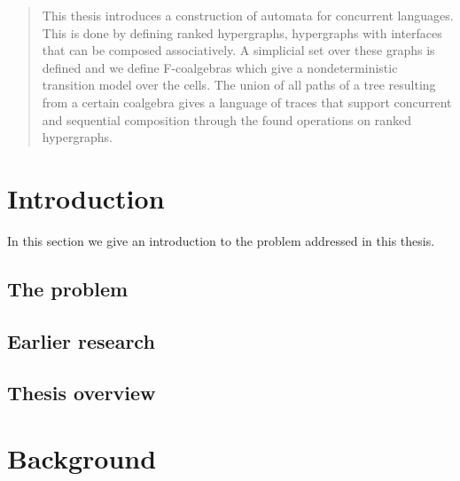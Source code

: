 \documentclass[12pt]{article}
\theoremstyle{definition}
\newcommand{\1}{\mathbbm{1}}
\begin{document}

\begin{abstract}
\noindent
This thesis introduces a construction of automata for concurrent languages. This is done by defining ranked hypergraphs, hypergraphs with interfaces that can be composed associatively. A simplicial set over these graphs is defined and we define F-coalgebras which give a nondeterministic transition model over the cells. The union of all paths of a tree resulting from a certain coalgebra gives a language of traces that support concurrent and sequential composition through the found operations on ranked hypergraphs. 
\end{abstract}

\bigskip

\thispagestyle{empty}
\tableofcontents
\thispagestyle{empty}

\clearpage
\setcounter{page}{1}

\section{Introduction} \label{introduction}

In this section we give an introduction to the problem addressed in this thesis.

\subsection{The problem}

\subsection{Earlier research}

\subsection{Thesis overview}

\newpage
\section{Background}
\end{document}
